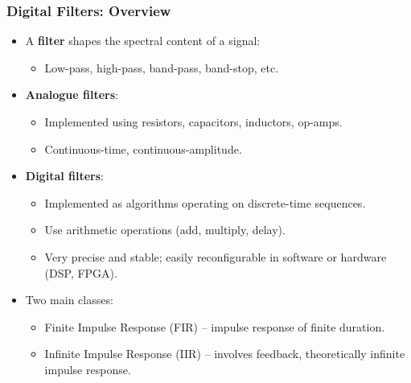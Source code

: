 \begin{frame}
	\frametitle{Digital Filters: Overview}
	\begin{itemize}
		\item A \textbf{filter} shapes the spectral content of a signal:
		\begin{itemize}
			\item Low-pass, high-pass, band-pass, band-stop, etc.
		\end{itemize}
		\item \textbf{Analogue filters}:
		\begin{itemize}
			\item Implemented using resistors, capacitors, inductors, op-amps.
			\item Continuous-time, continuous-amplitude.
		\end{itemize}
		\item \textbf{Digital filters}:
		\begin{itemize}
			\item Implemented as algorithms operating on discrete-time sequences.
			\item Use arithmetic operations (add, multiply, delay).
			\item Very precise and stable; easily reconfigurable in software or hardware (DSP, FPGA).
		\end{itemize}
		\item Two main classes:
		\begin{itemize}
			\item Finite Impulse Response (FIR) – impulse response of finite duration.
			\item Infinite Impulse Response (IIR) – involves feedback, theoretically infinite impulse response.
		\end{itemize}
	\end{itemize}
\end{frame}

